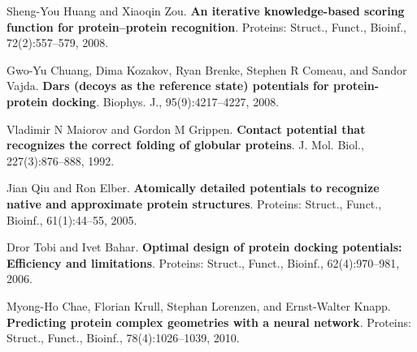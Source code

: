 \documentclass[12pt,twoside]{article}
\begin{document}
\begin{thebibliography}{1}
	Sheng-You Huang and Xiaoqin Zou.
	\textbf{An iterative knowledge-based scoring function for protein–protein recognition}.
	Proteins: Struct., Funct., Bioinf., 72(2):557–579, 2008.
	
	Gwo-Yu Chuang, Dima Kozakov, Ryan Brenke, Stephen R Comeau, and Sandor Vajda.
	\textbf{Dars (decoys as the reference state) potentials for protein-protein docking}.
	Biophys. J., 95(9):4217–4227, 2008.
	
	Vladimir N Maiorov and Gordon M Grippen.
	\textbf{Contact potential that recognizes the correct folding of globular proteins}.
	J. Mol. Biol., 227(3):876–888, 1992.
	
	Jian Qiu and Ron Elber.
	\textbf{Atomically detailed potentials to recognize native and approximate protein structures}.
	Proteins: Struct., Funct., Bioinf., 61(1):44–55, 2005.
	
	Dror Tobi and Ivet Bahar.
	\textbf{Optimal design of protein docking potentials: Efficiency and limitations}.
	Proteins: Struct., Funct., Bioinf., 62(4):970–981, 2006.
	
	Myong-Ho Chae, Florian Krull, Stephan Lorenzen, and Ernst-Walter Knapp.
	\textbf{Predicting protein complex geometries with a neural network}.
	Proteins: Struct., Funct., Bioinf., 78(4):1026–1039, 2010.
	

	
\end{thebibliography}
\end{document}
